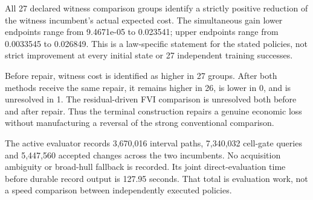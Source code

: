 All 27 declared witness comparison groups identify a strictly positive reduction of the witness incumbent's actual expected cost. The simultaneous gain lower endpoints range from 9.4671e-05 to 0.023541; upper endpoints range from 0.0033545 to 0.026849. This is a law-specific statement for the stated policies, not strict improvement at every initial state or 27 independent training successes.

Before repair, witness cost is identified as higher in 27 groups. After both methods receive the same repair, it remains higher in 26, is lower in 0, and is unresolved in 1. The residual-driven FVI comparison is unresolved both before and after repair. Thus the terminal construction repairs a genuine economic loss without manufacturing a reversal of the strong conventional comparison.

The active evaluator records 3,670,016 interval paths, 7,340,032 cell-gate queries and 5,447,560 accepted changes across the two incumbents. No acquisition ambiguity or broad-hull fallback is recorded. Its joint direct-evaluation time before durable record output is 127.95 seconds. That total is evaluation work, not a speed comparison between independently executed policies.

